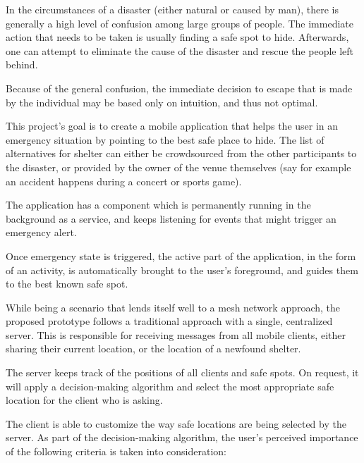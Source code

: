 
In the circumstances of a disaster (either natural or caused by man), there is
generally a high level of confusion among large groups of people. The
immediate action that needs to be taken is usually finding a safe spot to
hide. Afterwards, one can attempt to eliminate the cause of the disaster and
rescue the people left behind.

Because of the general confusion, the immediate decision to escape that is
made by the individual may be based only on intuition, and thus not optimal.

This project's goal is to create a mobile application that helps the user in an
emergency situation by pointing to the best safe place to hide. The list of
alternatives for shelter can either be crowdsourced from the other
participants to the disaster, or provided by the owner of the venue themselves
(say for example an accident happens during a concert or sports game).

The application has a component which is permanently running in the background
as a service, and keeps listening for events that might trigger an emergency
alert.

Once emergency state is triggered, the active part of the application, in the
form of an activity, is automatically brought to the user's foreground, and
guides them to the best known safe spot.

While being a scenario that lends itself well to a mesh network approach, the
proposed prototype follows a traditional approach with a single, centralized
server. This is responsible for receiving messages from all mobile clients,
either sharing their current location, or the location of a newfound shelter.

The server keeps track of the positions of all clients and safe spots. On
request, it will apply a decision-making algorithm and select the most
appropriate safe location for the client who is asking.

The client is able to customize the way safe locations are being selected by
the server. As part of the decision-making algorithm, the user's perceived
importance of the following criteria is taken into consideration:

